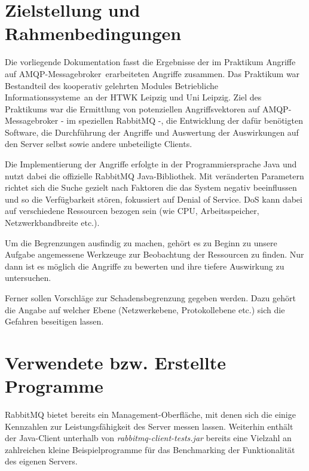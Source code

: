 \documentclass[	a4paper,
			11pt,
			oneside,
			parskip]{scrartcl}
\begin{document}
	
	
\section*{Zielstellung und Rahmenbedingungen}
	
	Die vorliegende Dokumentation fasst die Ergebnisse der im Praktikum \glqq Angriffe auf AMQP-Messagebroker\grqq\ erarbeiteten Angriffe zusammen. Das Praktikum war Bestandteil des kooperativ gelehrten
	Modules \glqq Betriebliche Informationssysteme\grqq\ an der HTWK Leipzig und Uni Leipzig. Ziel des Praktikums war die Ermittlung von potenziellen Angriffsvektoren auf AMQP-Messagebroker - im speziellen RabbitMQ -, die Entwicklung der dafür benötigten Software, die Durchführung der Angriffe und Auswertung der Auswirkungen auf den Server selbst sowie andere unbeteiligte Clients.

	Die Implementierung der Angriffe erfolgte in der Programmiersprache Java und nutzt dabei die offizielle RabbitMQ Java-Bibliothek.
	Mit veränderten Parametern richtet sich die Suche gezielt nach Faktoren die das System negativ beeinflussen und so die Verfügbarkeit stören, fokussiert auf \glqq Denial of Service\grqq. DoS
	kann dabei auf verschiedene Ressourcen bezogen sein (wie CPU, Arbeitsspeicher, Netzwerkbandbreite etc.).

	Um die Begrenzungen ausfindig zu machen, gehört es zu Beginn zu unsere Aufgabe angemessene Werkzeuge zur Beobachtung der Ressourcen zu finden. Nur dann ist es möglich die Angriffe zu bewerten
	und ihre tiefere Auswirkung zu untersuchen.

	Ferner sollen Vorschläge zur Schadensbegrenzung gegeben werden. Dazu gehört die Angabe auf welcher Ebene (Netzwerkebene, Protokollebene etc.) sich die Gefahren beseitigen lassen.



%	
%
\clearpage
\section*{Verwendete bzw. Erstellte Programme}
	
	RabbitMQ bietet bereits ein Management-Oberfläche, mit denen sich die einige Kennzahlen zur Leistungsfähigkeit des Server messen lassen. Weiterhin enthält der Java-Client unterhalb von
	\textit{rabbitmq-client-tests.jar} bereits eine Vielzahl an zahlreichen kleine Beispielprogramme für das Benchmarking der Funktionalität des eigenen Servers.  
	
\end{document}
